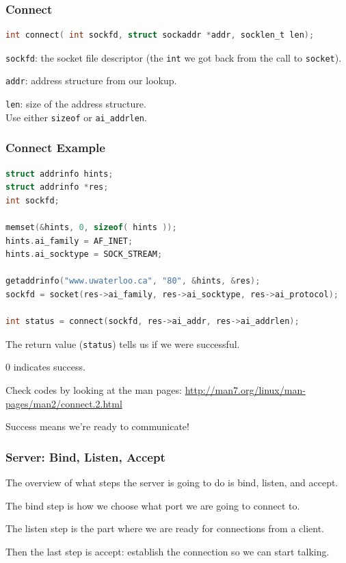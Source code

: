 \begin{frame}[fragile]
	\frametitle{Connect}

	\begin{lstlisting}[language=C]
int connect( int sockfd, struct sockaddr *addr, socklen_t len); 
\end{lstlisting}

	\texttt{sockfd}: the socket file descriptor (the \texttt{int} we got back from the call to \texttt{socket}).

	\texttt{addr}: address structure from our lookup.

	\texttt{len}: size of the address structure. \\
	\quad Use either \texttt{sizeof} or \texttt{ai\_addrlen}.

\end{frame}


\begin{frame}[fragile]
	\frametitle{Connect Example}

	\begin{lstlisting}[language=C]
struct addrinfo hints;
struct addrinfo *res;
int sockfd;

memset(&hints, 0, sizeof( hints ));
hints.ai_family = AF_INET;
hints.ai_socktype = SOCK_STREAM;

getaddrinfo("www.uwaterloo.ca", "80", &hints, &res);
sockfd = socket(res->ai_family, res->ai_socktype, res->ai_protocol);

int status = connect(sockfd, res->ai_addr, res->ai_addrlen);
\end{lstlisting}

	The return value (\texttt{status}) tells us if we were successful.

	0 indicates success.

	Check codes by looking at the man pages: \url{http://man7.org/linux/man-pages/man2/connect.2.html}

	Success means we're ready to communicate!

\end{frame}




\begin{frame}
	\frametitle{Server: Bind, Listen, Accept}


	The overview of what steps the server is going to do is bind, listen, and accept.

	The bind step is how we choose what port we are going to connect to.

	The listen step is the part where we are ready for connections from a client.

	Then the last step is accept: establish the connection so we can start talking.

\end{frame}



